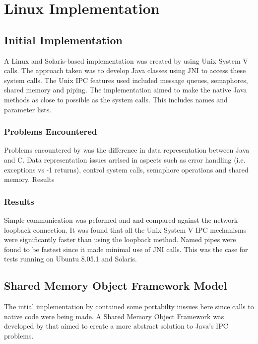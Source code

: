\documentclass[12pt,a4paper,oneside]{article}
\begin{document}
\section{Linux Implementation}

\begin{spacing}{1.4}
\subsection{Initial Implementation}
A Linux and Solaris-based
implementation was created by \cite{WellsIPCMultiProc} using Unix
System V calls. The approach taken was to develop Java classes using JNI
to access these system calls. The Unix IPC features used included
message queues, semaphores, shared memory and piping. The
implementation aimed to make the native Java methods as close to
possible as the system calls. This includes names and parameter lists.

\subsubsection{Problems Encountered}
Problems encountered by \cite{WellsIPCMultiProc} was the
difference in data representation between Java and C. Data representation
issues arrised in aspects such as error handling (i.e. exceptions vs -1
returns), control system calls, semaphore operations and shared memory.
Results

\subsubsection{Results}
Simple communication was peformed and and
compared against the network loopback connection. It was found that all
the Unix System V IPC mechanisms were significantly faster than using the
loopback method. Named pipes were found to be fastest since it made
minimal use of JNI calls. This was the case for tests running on Ubuntu
8.05.1 and Solaris.

\subsection{Shared Memory Object Framework Model}
The intial implementation by \cite{WellsIPCMultiProc} contained some
portabilty inssues here since calls to native code were being made. A
Shared Memory Object Framework was developed by \cite{WellsEfficientIPCJava} that aimed to create a more abstract solution to Java's IPC problems.
\end{spacing}
\end{document}
